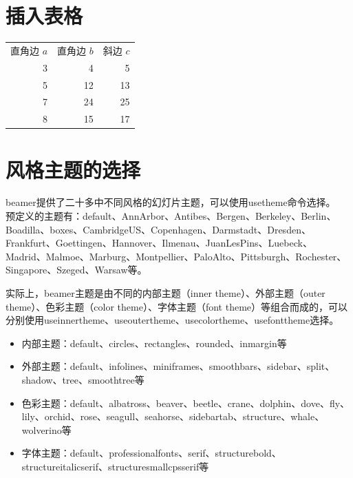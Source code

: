 \documentclass[xcolor=table,aspectratio=169]{beamer}
\begin{document}
\section{插入表格}
\begin{frame}
\centering
\begin{tabular}{rrr}
	\rowcolor{red} 直角边 $a$ &直角边 $b$ & 斜边 $c$\\
	3 & 4 & 5 \\
	5 & 12 & 13\\
	7 & 24 & 25\\
	8 & 15 & 17\\
\end{tabular}
\end{frame}

\section{风格主题的选择}
\begin{frame}
beamer提供了二十多中不同风格的幻灯片主题，可以使用usetheme命令选择。\\
预定义的主题有：default、AnnArbor、Antibes、Bergen、Berkeley、Berlin、Boadilla、boxes、CambridgeUS、Copenhagen、Darmstadt、Dresden、Frankfurt、Goettingen、Hannover、Ilmenau、JuanLesPins、Luebeck、Madrid、Malmoe、Marburg、Montpellier、PaloAlto、Pittsburgh、Rochester、Singapore、Szeged、Warsaw等。

实际上，beamer主题是由不同的内部主题（inner theme）、外部主题（outer theme）、色彩主题（color theme）、字体主题（font theme）等组合而成的，可以分别使用useinnertheme、useoutertheme、usecolortheme、usefonttheme选择。

\end{frame}
\begin{frame}
	\begin{itemize}
		\item 内部主题：default、circles、rectangles、rounded、inmargin等
		\item 外部主题：default、infolines、miniframes、smoothbars、sidebar、split、shadow、tree、smoothtree等
		\item 色彩主题：default、albatross、beaver、beetle、crane、dolphin、dove、fly、lily、orchid、rose、seagull、seahorse、sidebartab、structure、whale、wolverino等
		\item 字体主题：default、professionalfonts、serif、structurebold、structureitalicserif、structuresmallcpsserif等
	\end{itemize}
\end{frame}
\end{document}
